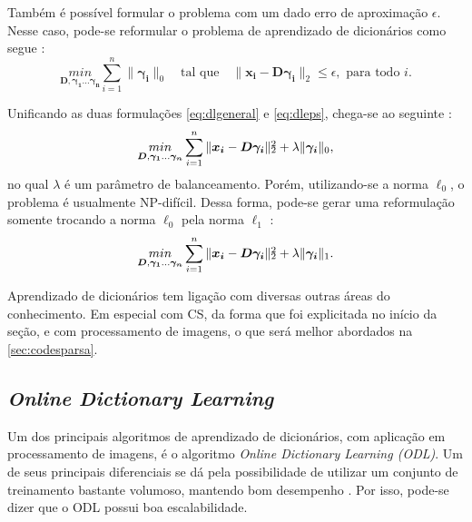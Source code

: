 \documentclass[cic,tc]{iiufrgs}
\def\SPSB#1#2{\rlap{\textsuperscript{#1}}\SB{#2}}
\def\SB#1{\textsubscript{#1}}
\renewcommand{\vec}[1]{\bm{#1}}
\newcommand{\mat}[1]{\bm{#1}}
\begin{document}
Também é possível formular o problema com um dado erro de aproximação $\epsilon$.
Nesse caso, pode-se reformular o problema de aprendizado de dicionários como segue \cite{chen2015compressed}:
\begin{equation}
    \label{eq:dleps}
    \underset{\mat{D}, \vec{\gamma_1}...\vec{\gamma_n}}{min} 
    \sum_{i=1}^{n} {\lVert \vec{\gamma_i} \rVert_0}
    \hspace{1em} \text{tal que} \hspace{1em}
    \lVert \vec{x_i} - \mat{D}\vec{\gamma_i} \rVert_2 \le \epsilon, \text{ para todo } i.
\end{equation}

Unificando as duas formulações \eqref{eq:dlgeneral} e \eqref{eq:dleps}, chega-se ao seguinte
\cite{chen2015compressed}:
\begin{equation}
    \label{eq:dlunica}
    \underset{\mat{D}, \vec{\gamma_1}...\vec{\gamma_n}}{min} 
    \sum_{i=1}^{n} {\lVert \vec{x_i} - \mat{D}\vec{\gamma_i} \rVert\SPSB{2}{2} + \lambda \lVert \vec{\gamma_i} \rVert_0},
\end{equation}
no qual $\lambda$ é um parâmetro de balanceamento.
Porém, utilizando-se a norma $\ell_0$, o problema é usualmente NP-difícil. Dessa forma, pode-se gerar
uma reformulação somente trocando a norma $\ell_0$ pela norma $\ell_1$ \cite{chen2015compressed}:
\begin{equation}
    \label{eq:dlunical1}
    \underset{\mat{D}, \vec{\gamma_1}...\vec{\gamma_n}}{min} 
    \sum_{i=1}^{n} {\lVert \vec{x_i} - \mat{D}\vec{\gamma_i} \rVert\SPSB{2}{2} + \lambda \lVert \vec{\gamma_i} \rVert_1}.
\end{equation}

Aprendizado de dicionários tem ligação com diversas outras áreas do conhecimento. 
Em especial
com CS, da forma que foi explicitada no início da seção, e com processamento de imagens,
o que será melhor abordados na \autoref{sec:codesparsa}.

\subsection{\textit{Online Dictionary Learning}}
\label{sec:odl}
Um dos principais algoritmos de aprendizado de dicionários, com aplicação em processamento de imagens, 
é o algoritmo \textit{Online Dictionary Learning (ODL)}. Um de seus principais diferenciais
se dá pela possibilidade de utilizar um conjunto de treinamento bastante volumoso, mantendo bom 
desempenho \cite{MairalOnlineDictLearn}.
Por isso, pode-se dizer que o ODL possui boa escalabilidade.
\end{document}
